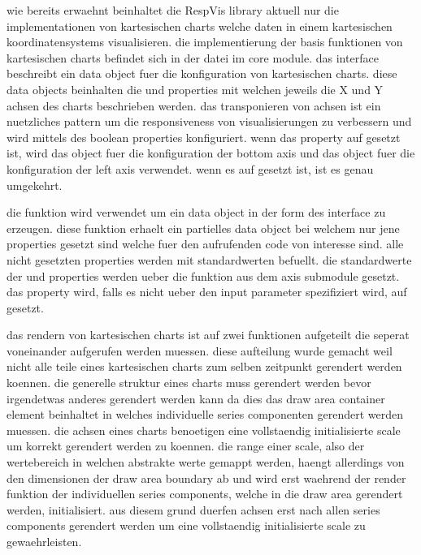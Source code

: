 wie bereits erwaehnt beinhaltet die RespVis library aktuell nur die implementationen von kartesischen charts welche daten in einem kartesischen koordinatensystems visualisieren.
die implementierung der basis funktionen von kartesischen charts befindet sich in der  datei im core module. 
das  interface beschreibt ein data object fuer die konfiguration von kartesischen charts.
diese data objects beinhalten die  und   properties mit welchen jeweils die X und Y achsen des charts beschrieben werden.
das transponieren von achsen ist ein nuetzliches pattern um die responsiveness von visualisierungen zu verbessern und wird mittels des  boolean properties konfiguriert.
wenn das  property auf  gesetzt ist, wird das  object fuer die konfiguration der bottom axis und das  object fuer die konfiguration der left axis verwendet. 
wenn es auf  gesetzt ist, ist es genau umgekehrt.

die  funktion wird verwendet um ein data object in der form des  interface zu erzeugen.
diese funktion erhaelt ein partielles data object bei welchem nur jene properties gesetzt sind welche fuer den aufrufenden code von interesse sind.
alle nicht gesetzten properties werden mit standardwerten befuellt.
die standardwerte der  und  properties werden ueber die  funktion aus dem axis submodule gesetzt.
das  property wird, falls es nicht ueber den input parameter spezifiziert wird, auf  gesetzt.

das rendern von kartesischen charts ist auf zwei funktionen aufgeteilt die seperat voneinander aufgerufen werden muessen.
diese aufteilung wurde gemacht weil nicht alle teile eines kartesischen charts zum selben zeitpunkt gerendert werden koennen.
die generelle struktur eines charts muss gerendert werden bevor irgendetwas anderes gerendert werden kann da dies das draw area container element beinhaltet in welches individuelle series componenten gerendert werden muessen.
die achsen eines charts benoetigen eine vollstaendig initialisierte scale um korrekt gerendert werden zu koennen.
die range einer scale, also der wertebereich in welchen abstrakte werte gemappt werden, haengt allerdings von den dimensionen der draw area boundary ab und wird erst waehrend der render funktion der individuellen series components, welche in die draw area gerendert werden, initialisiert.    
aus diesem grund duerfen achsen erst nach allen series components gerendert werden um eine vollstaendig initialisierte scale zu gewaehrleisten.

